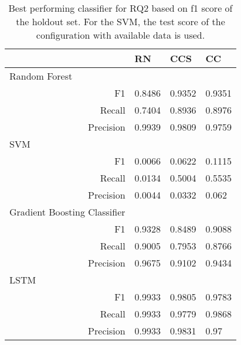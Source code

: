 \begin{table}[]
    \begin{tabularx}{\textwidth}{rXXX}
    \toprule
    \multicolumn{1}{l}{}                             & RN         & CCS & CC \\ \midrule
    \multicolumn{1}{l}{Random Forest}                & \multicolumn{1}{r}{} &            &              \\
    F1                                               & 0.8486               & 0.9352     & 0.9351       \\
    Recall                                           & 0.7404               & 0.8936     & 0.8976       \\
    Precision                                        & 0.9939               & 0.9809     & 0.9759       \\ \midrule
    \multicolumn{1}{l}{SVM}                          &                      &            &              \\
    F1                                               &   0.0066             &  0.0622    &   0.1115     \\
    Recall                                           &   0.0134             &  0.5004    &   0.5535     \\
    Precision                                        &   0.0044             &  0.0332    &   0.062      \\ \midrule
    \multicolumn{1}{l}{Gradient Boosting Classifier} &                      &            &              \\
    F1                                               & 0.9328               & 0.8489     & 0.9088       \\
    Recall                                           & 0.9005               & 0.7953     & 0.8766       \\
    Precision                                        & 0.9675               & 0.9102     & 0.9434       \\ \midrule
    \multicolumn{1}{l}{LSTM}                         &                      &            &              \\
    F1                                               & 0.9933               & 0.9805     & 0.9783       \\
    Recall                                           & 0.9933               & 0.9779     & 0.9868       \\
    Precision                                        & 0.9933               & 0.9831     & 0.97       \\ \bottomrule
    \end{tabularx}
    \caption{Best performing classifier for RQ2 based on f1 score of the holdout set. For the SVM, the test score of the configuration with available data is used.}
    \label{tab:rq2_best_classifier}
    \end{table}